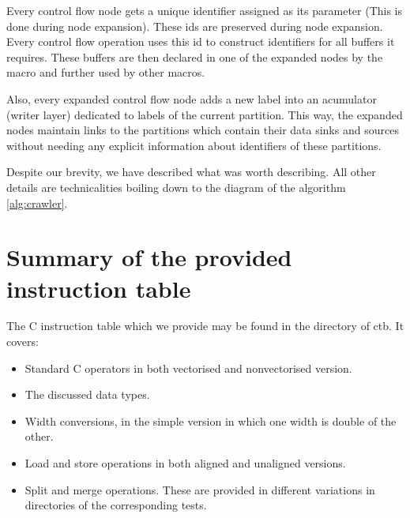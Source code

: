 Every control flow node gets a unique identifier assigned as its parameter (This is done during node expansion). These ids are preserved during node expansion. Every control flow operation uses this id to construct identifiers for all buffers it requires. These buffers are then declared in one of the expanded nodes by the  macro and further used by other macros.

Also, every expanded control flow node adds a new label into an acumulator (writer layer) dedicated to labels of the current partition. This way, the expanded nodes maintain links to the partitions which contain their data sinks and sources without needing any explicit information about identifiers of these partitions.

Despite our brevity, we have described what was worth describing. All other details are technicalities boiling down to the diagram of the algorithm \ref{alg:crawler}.

\section{ Summary of the provided instruction table }

The C instruction table which we provide may be found in the  directory of ctb. It covers:
\begin{itemize}
  \item Standard C operators in both vectorised and nonvectorised version.
  \item The discussed data types.
  \item Width conversions, in the simple version in which one width is double of the other.
  \item Load and store operations in both aligned and unaligned versions.
  \item Split and merge operations. These are provided in different variations in directories of the corresponding tests. 
\end{itemize}


